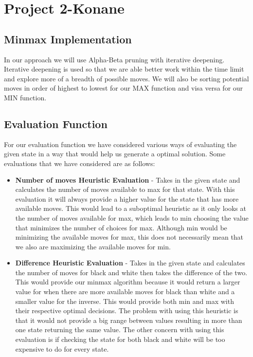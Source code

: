 \documentclass[12pt]{article}
\begin{document}
\section*{Project 2-Konane}

\subsection*{Minmax Implementation}
In our approach we will use Alpha-Beta pruning with iterative deepening.
Iterative deepening is used so that we are able better work within the time limit and explore more of a breadth of possible moves.
We will also be sorting potential moves in order of highest to lowest for our MAX function and visa versa for our MIN function.

\subsection*{Evaluation Function}
For our evaluation function we have considered various ways of evaluating the given state in a way that would help us generate a optimal solution.
Some evaluations that we have considered are as follows:

\begin{itemize}
\item \textbf{Number of moves Heuristic Evaluation} - 
Takes in the given state and calculates the number of moves available to max for that state. 
With this evaluation it will always provide a higher value for the state that has more available moves. 
This would lead to a suboptimal heuristic as it only looks at the number of moves available for max, which leads to min choosing the value that minimizes the number of choices for max. 
Although min would be minimizing the available moves for max, this does not necessarily mean that we also are maximizing the available moves for min.

\item \textbf{Difference Heuristic Evaluation} -
Takes in the given state and calculates the number of moves for black and white then takes the difference of the two. 
This would provide our minmax algorithm because it would return a larger value for when there are more available moves for black than white and a smaller value for the inverse.
This would provide both min and max with their respective optimal decisions.
The problem with using this heuristic is that it would not provide a big range between values resulting in more than one state returning the same value.
The other concern with using this evaluation is if checking the state for both black and white will be too expensive to do for every state.

\end{itemize}
\end{document}
